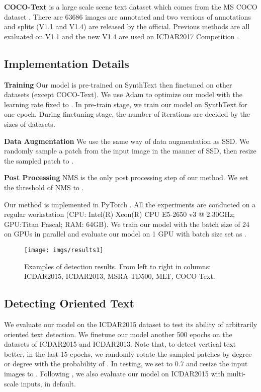 \documentclass[10pt,twocolumn,letterpaper]{article}
\begin{document}
\textbf{COCO-Text} \cite{veit2016coco} is a large scale scene text dataset which comes from the MS COCO dataset \cite{lin2014microsoft}. There are 63686 images are annotated and two versions of annotations and splits (V1.1 and V1.4) are released by the official. Previous methods are all evaluated on V1.1 and the new V1.4 are used on ICDAR2017 Competition \cite{COCO-Text-Challenge}. 
\subsection{Implementation Details}
\textbf{Training} Our model is pre-trained on SynthText then finetuned on other datasets (except COCO-Text). We use Adam \cite{kingma2014adam} to optimize our model with the learning rate fixed to . In pre-train stage, we train our model on SynthText for one epoch. During finetuning stage, the number of iterations are decided by the sizes of datasets.

\textbf{Data Augmentation} We use the same way of data augmentation as SSD. We randomly sample a patch from the input image  in the manner of SSD, then resize the sampled patch to . 

\textbf{Post Processing} NMS is the only  post processing step of our method. We set the threshold of NMS to .

Our method is implemented in PyTorch \cite{PyTorch}. All the experiments are conducted on a regular workstation (CPU: Intel(R) Xeon(R) CPU E5-2650 v3 @ 2.30GHz; GPU:Titan Pascal; RAM: 64GB). We train our model with the batch size of 24 on  GPUs in parallel and evaluate our model on 1 GPU with batch size set as .

\begin{figure*}

\noindent \begin{centering}
\texttt{[image: imgs/results1]}
\par\end{centering}
\caption{Examples of detection results. From left to right in columns: ICDAR2015, ICDAR2013, MSRA-TD500, MLT, COCO-Text.}
\label{img_results}
\end{figure*}

\subsection{Detecting Oriented Text}

We evaluate our model on the ICDAR2015 dataset to test its ability of arbitrarily oriented text detection. We finetune our model another 500 epochs on the datasets of ICDAR2015 and ICDAR2013. Note that, to detect vertical text better, in the last 15 epochs, we randomly rotate the sampled patches by  degree or  degree with the probability  of . In testing, we set  to 0.7 and  resize the input images to . Following \cite{Zhou_2017_CVPR,Hu_2017_ICCV,He_2017_ICCV}, we also evaluate our model on ICDAR2015 with multi-scale inputs,  in default.
\end{document}

